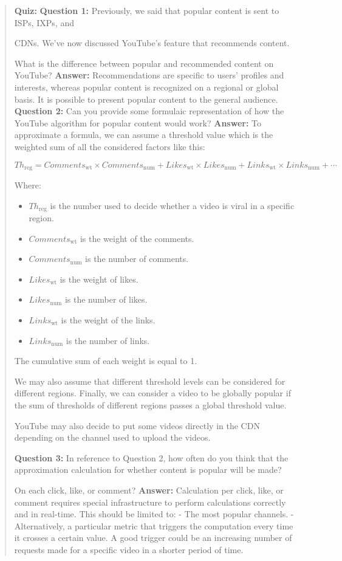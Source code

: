 \begin{quote}
\textbf{Quiz:}
\textbf{Question 1:} Previously, we said that popular content is sent to ISPs, IXPs, and

CDNs. We've now discussed YouTube's feature that recommends content.

What is the difference between popular and recommended content on YouTube?
\textbf{Answer:} Recommendations are specific to users' profiles and interests, whereas popular content is recognized on a regional or global basis. It is possible to present popular content to the general audience.
\textbf{Question 2:} Can you provide some formulaic representation of how the YouTube algorithm for popular content would work?
\textbf{Answer:} To approximate a formula, we can assume a threshold value which is the weighted sum of all the considered factors like this:

$$
Th_{\text{reg}} =
Comments_{\text{wt}} \times Comments_{\text{num}}
+ Likes_{\text{wt}} \times Likes_{\text{num}}
+ Links_{\text{wt}} \times Links_{\text{num}}
+ \cdots
$$

Where:

\begin{itemize}
    \item $Th_{\text{reg}}$ is the number used to decide whether a video is viral in a specific region.
    \item $Comments_{\text{wt}}$ is the weight of the comments.
    \item $Comments_{\text{num}}$ is the number of comments.
    \item $Likes_{\text{wt}}$ is the weight of likes.
    \item $Likes_{\text{num}}$ is the number of likes.
    \item $Links_{\text{wt}}$ is the weight of the links.
    \item $Links_{\text{num}}$ is the number of links.
\end{itemize}

The cumulative sum of each weight is equal to 1.

We may also assume that different threshold levels can be considered for different regions.  
Finally, we can consider a video to be globally popular if the sum of thresholds of different regions passes a global threshold value.

YouTube may also decide to put some videos directly in the CDN depending on the channel used to upload the videos.

\textbf{Question 3:} In reference to Question 2, how often do you think that the approximation calculation for whether content is popular will be made?

On each click, like, or comment?
\textbf{Answer:} Calculation per click, like, or comment requires special infrastructure to perform calculations correctly and in real-time. This should be limited to: - The most popular channels. - Alternatively, a particular metric that triggers the computation every time it crosses a certain value. A good trigger could be an increasing number of requests made for a specific video in a shorter period of time.
\end{quote}

